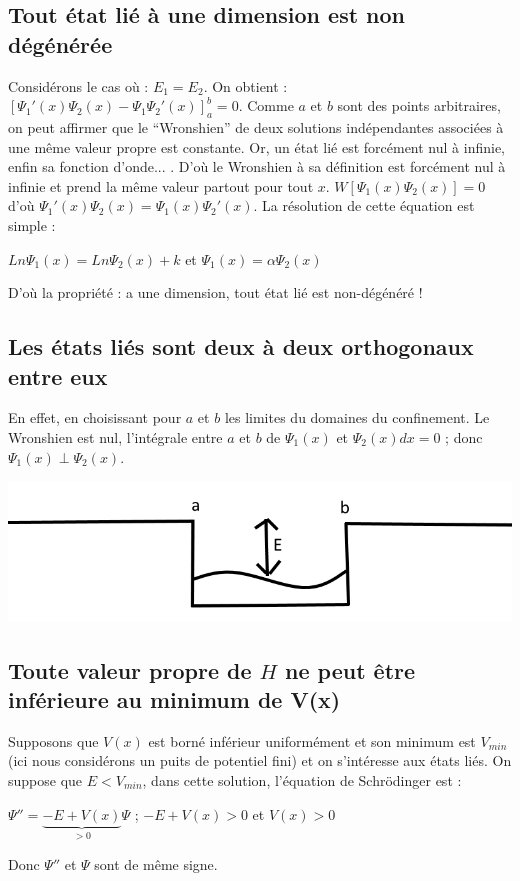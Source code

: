 \documentclass[12pt,a4paper,titlepage]{book}
\begin{document}
\subsection{Tout état lié à une dimension est non dégénérée}

Considérons le cas où : $E_1 = E_2$. On obtient : $\left[ \Psi_1 ' (x) \Psi_2 (x) - \Psi_1 \Psi_2 ' (x) \right]_a^b = 0$. Comme $a$ et $b$ sont des points arbitraires, on peut affirmer que le \enquote{Wronshien} de deux solutions indépendantes associées à une même valeur propre est constante. Or, un état lié est forcément nul à infinie, enfin sa fonction d'onde... . D'où le Wronshien à sa définition est forcément nul à infinie et prend la même valeur partout pour tout $x$. $W[\Psi_1 (x) \Psi_2 (x)]=0$ d'où $\Psi_1 ' (x) \Psi_2 (x) = \Psi_1 (x) \Psi_2 ' (x)$. La résolution de cette équation est simple :
\begin{center}
$Ln \Psi_1 (x) = Ln \Psi_2 (x) + k$ et $\Psi_1 (x) = \alpha \Psi_2 (x)$
\end{center}
D'où la propriété : a une dimension, tout état lié est non-dégénéré !

\subsection{Les états liés sont deux à deux orthogonaux entre eux}

En effet, en choisissant pour $a$ et $b$ les limites du domaines du confinement. Le Wronshien est nul, l'intégrale entre $a$ et $b$ de $\Psi_1 (x)$ et $\Psi_2 (x) dx = 0$ ; donc $\Psi_1 (x) \perp \Psi_2 (x)$.

\begin{center}
\includegraphics[scale=0.4]{6-2-4-Confinement.png}
\end{center}

\subsection{Toute valeur propre de $H$ ne peut être inférieure au minimum de V(x)}

Supposons que $V(x)$ est borné inférieur uniformément et son minimum est $V_{min}$ (ici nous considérons un puits de potentiel fini) et on s'intéresse aux états liés. On suppose que $E < V_{min}$, dans cette solution, l'équation de Schrödinger est :
\begin{center}
$\Psi'' = \underbrace{-E + V(x)}_{> 0} \Psi$ ; $-E + V(x) > 0$ et $V(x) > 0$
\end{center}
Donc $\Psi''$ et $\Psi$ sont de même signe.
\end{document}
